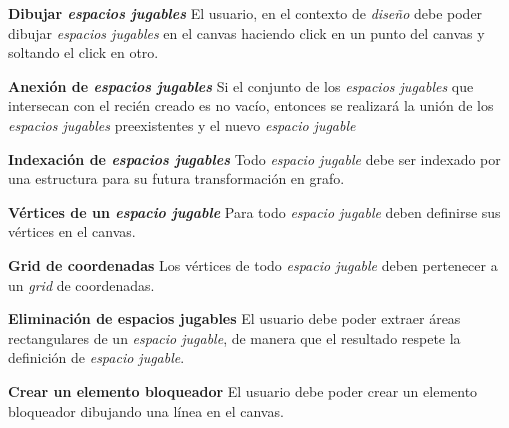 	\item \textbf{Dibujar \textit{espacios jugables}}\newline
		El usuario, en el contexto de \textit{diseño} debe poder dibujar \textit{espacios jugables} en el canvas haciendo click en un punto del canvas y soltando el click en otro.
		\begin{functional}
			\item \textbf{Anexión de \textit{espacios jugables}}\newline
				Si el conjunto de los \textit{espacios jugables} que intersecan con el recién creado es no vacío, entonces se realizará la unión de los \textit{espacios jugables} preexistentes y el nuevo \textit{espacio jugable}
			\item \textbf{Indexación de \textit{espacios jugables}}\newline
				Todo \textit{espacio jugable} debe ser indexado por una estructura para su futura transformación en grafo.
			\item \textbf{Vértices de un \textit{espacio jugable}}\newline
				Para todo \textit{espacio jugable} deben definirse sus vértices en el canvas.
			\item \textbf{Grid de coordenadas}
				Los vértices de todo \textit{espacio jugable} deben pertenecer a un \textit{grid} de coordenadas.
		\end{functional}
	\item \textbf{Eliminación de espacios jugables}\newline
		El usuario debe poder extraer áreas rectangulares de un \textit{espacio jugable}, de manera que el resultado respete la definición de \textit{espacio jugable}.
	\item \textbf{Crear un elemento bloqueador}\newline
		El usuario debe poder crear un elemento bloqueador dibujando una línea en el canvas.
